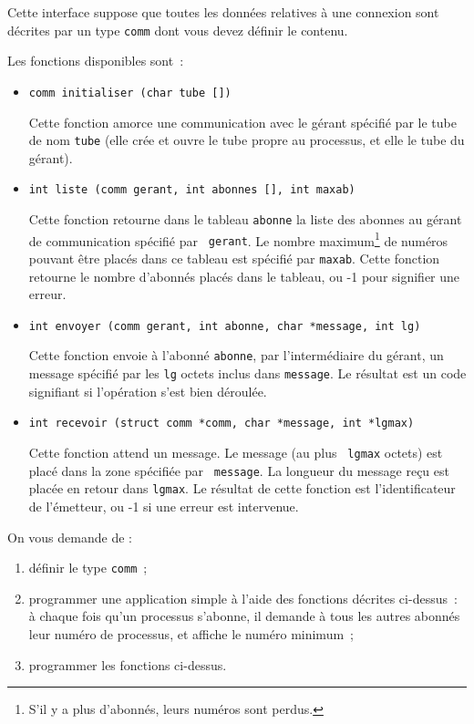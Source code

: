 Cette interface suppose que toutes les données relatives à une
connexion sont décrites par un type {\tt comm} dont vous devez
définir le contenu.

Les fonctions disponibles sont~:

\begin {itemize}

    \item \verb:comm initialiser (char tube []):

	Cette fonction amorce une communication avec le gérant spécifié
	par le tube de nom {\tt tube} (elle crée et ouvre le tube propre
	au processus, et elle le tube du gérant).

    \item \verb:int liste (comm gerant, int abonnes [], int maxab):

	Cette fonction retourne dans le tableau {\tt abonne} la liste
	des abonnes au gérant de communication spécifié par {\tt
	gerant}.  Le nombre maximum\footnote {S'il y a plus d'abonnés,
	leurs numéros sont perdus.} de numéros pouvant être placés dans
	ce tableau est spécifié par {\tt maxab}. Cette fonction retourne
	le nombre d'abonnés placés dans le tableau, ou -1 pour signifier
	une erreur.
    
    \item \verb:int envoyer (comm gerant, int abonne, char *message, int lg):

	Cette fonction envoie à l'abonné {\tt abonne}, par
	l'intermédiaire du gérant, un message spécifié par les {\tt lg}
	octets inclus dans {\tt message}.  Le résultat est un code
	signifiant si l'opération s'est bien déroulée.

    \item \verb:int recevoir (struct comm *comm, char *message, int *lgmax):

	Cette fonction attend un message. Le message (au plus {\tt
	lgmax} octets) est placé dans la zone spécifiée par {\tt
	message}. La longueur du message reçu est placée en retour dans
	{\tt lgmax}. Le résultat de cette fonction est l'identificateur
	de l'émetteur, ou -1 si une erreur est intervenue.

\end {itemize}

On vous demande de :

\begin {enumerate}

    \item définir le type {\tt comm}~;

    \item programmer une application simple à l'aide des fonctions
	décrites ci-dessus~: à chaque fois qu'un processus s'abonne, il
	demande à tous les autres abonnés leur numéro de processus, et
	affiche le numéro minimum~;
    
    \item programmer les fonctions ci-dessus.

\end {enumerate}



